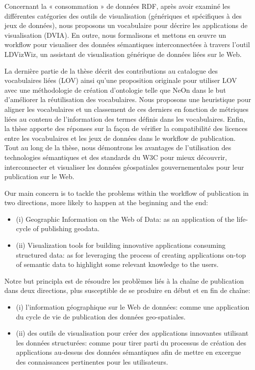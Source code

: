 \documentclass[a4paper,11pt,twoside]{report}
\begin{document}
Concernant la « consommation » de données RDF, après avoir examiné les différentes catégories des outils de visualisation (génériques et spécifiques à des jeux de données), nous proposons un vocabulaire pour décrire les applications de visualisation (DVIA). En outre, nous formalisons et mettons en œuvre un workflow pour visualiser des données sémantiques interconnectées à travers l'outil LDVizWiz, un assistant de visualisation générique de données liées sur le Web. 

La dernière partie de la thèse décrit des contributions au catalogue des vocabulaires liées (LOV) ainsi qu'une proposition originale pour utiliser LOV avec une méthodologie de création d'ontologie telle que NeOn dans le but d'améliorer la réutilisation des vocabulaires. Nous proposons une heuristique pour aligner les vocabulaires et un classement de ces derniers en fonction de métriques liées au contenu de l'information des termes définis dans les vocabulaires. Enfin, la thèse apporte des réponses sur la façon de vérifier la compatibilité des licences entre les vocabulaires et les jeux de données dans le workflow de publication. Tout au long de la thèse, nous démontrons les avantages de l'utilisation des technologies sémantiques et des standards du W3C pour mieux découvrir, interconnecter et visualiser les données géospatiales gouvernementales pour leur publication sur le Web.

Our main concern is to tackle the problems within the workflow of publication in two directions, more likely to happen at the beginning and the end: 
\begin{itemize}
\item (i) Geographic Information on the Web of Data: as an application of the life-cycle of publishing geodata.
\item (ii) Visualization tools for building innovative applications consuming structured data: as for leveraging the process of creating applications on-top of semantic data to highlight some relevant knowledge to the users.

\end{itemize}

Notre but principla est de résoudre les problèmes liés à la chaîne de publication dans deux directions, plus susceptible de se produire en début et en fin de chaîne:
\begin{itemize}
\item (i) l'information géographique sur le Web de données: comme une application du cycle de vie de publication des données geo-spatiales.
\item (ii) des outils de visualisation pour créer des applications innovantes utilisant les données structurées: comme pour tirer parti du processus de création des applications au-dessus des données sémantiques afin de mettre en excergue  des connaissances pertinentes pour les utilisateurs.
\end{itemize}
\end{document}
